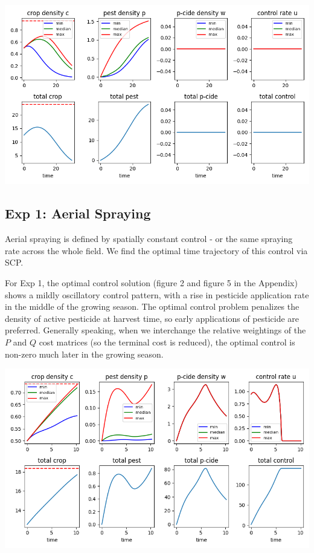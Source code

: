 \documentclass[11pt]{article}
\begin{document}
\begin{minipage}{\textwidth}
	\begin{center}
		\includegraphics[width=0.8\linewidth]{../sim_240604-091905/time.png}
	\end{center}
\end{minipage}

\subsection{Exp 1: Aerial Spraying}

Aerial spraying is defined by spatially constant control - or the same spraying rate across the whole field. We find the optimal time trajectory of this control via SCP.

For Exp 1, the optimal control solution (figure 2 and  figure 5 in the Appendix) shows a mildly oscillatory control pattern, with a rise in pesticide application rate in the middle of the growing season. The optimal control problem penalizes the density of active pesticide at harvest time, so early applications of pesticide are preferred. Generally speaking, when we interchange the relative weightings of the $P$ and $Q$ cost matrices (so the terminal cost is reduced), the optimal control is non-zero much later in the growing season.

\begin{minipage}{\textwidth}
	\begin{center}
		\includegraphics[width=0.8\linewidth]{../scp_240604-091225/time.png}
	\end{center}
\end{minipage}
\end{document}
